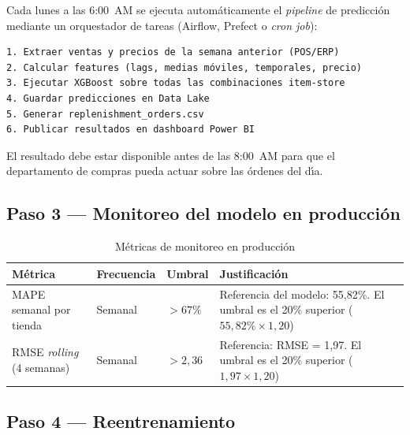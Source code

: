 \documentclass[12pt, a4paper, oneside]{report}
\begin{document}
Cada lunes a las 6:00~AM se ejecuta autom\'aticamente el \textit{pipeline} de predicci\'on mediante un orquestador de tareas (Airflow, Prefect o \textit{cron job}):

\begin{lstlisting}[caption={Pipeline semanal de predicci\'on}, label={lst:pipeline}, style=pseudostyle]
1. Extraer ventas y precios de la semana anterior (POS/ERP)
2. Calcular features (lags, medias móviles, temporales, precio)
3. Ejecutar XGBoost sobre todas las combinaciones item-store
4. Guardar predicciones en Data Lake
5. Generar replenishment_orders.csv
6. Publicar resultados en dashboard Power BI
\end{lstlisting}

El resultado debe estar disponible antes de las 8:00~AM para que el departamento de compras pueda actuar sobre las \'ordenes del d\'{\i}a.

\subsection{Paso 3 --- Monitoreo del modelo en producci\'on}

\begin{table}[H]
  \centering
  \caption{M\'etricas de monitoreo en producci\'on}
  \label{tab:monitoreo}
  \begin{tabularx}{\textwidth}{L{3.5cm} C{2.2cm} C{2.2cm} X}
    \toprule
    {\color{white}\textbf{M\'etrica}} &
    {\color{white}\textbf{Frecuencia}} &
    {\color{white}\textbf{Umbral}} &
    {\color{white}\textbf{Justificaci\'on}} \\
    \midrule
    MAPE semanal por tienda & Semanal & $>67\%$ &
    Referencia del modelo: 55,82\%. El umbral es el 20\% superior ($55{,}82\% \times 1{,}20$) \\
    RMSE \textit{rolling} (4 semanas) & Semanal & $>2{,}36$ &
    Referencia: RMSE = 1,97. El umbral es el 20\% superior ($1{,}97 \times 1{,}20$) \\
    \bottomrule
  \end{tabularx}
\end{table}

\subsection{Paso 4 --- Reentrenamiento}
\end{document}
